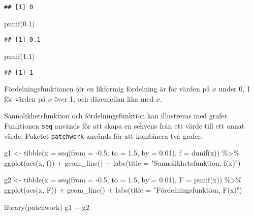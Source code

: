 \documentclass[
]{book}
\newenvironment{Shaded}{\begin{snugshade}}{\end{snugshade}}
\newcommand{\AttributeTok}[1]{\textcolor[rgb]{0.77,0.63,0.00}{#1}}
\newcommand{\FloatTok}[1]{\textcolor[rgb]{0.00,0.00,0.81}{#1}}
\newcommand{\FunctionTok}[1]{\textcolor[rgb]{0.00,0.00,0.00}{#1}}
\newcommand{\NormalTok}[1]{#1}
\newcommand{\OtherTok}[1]{\textcolor[rgb]{0.56,0.35,0.01}{#1}}
\newcommand{\SpecialCharTok}[1]{\textcolor[rgb]{0.00,0.00,0.00}{#1}}
\newcommand{\StringTok}[1]{\textcolor[rgb]{0.31,0.60,0.02}{#1}}
\theoremstyle{definition}
\theoremstyle{definition}
\theoremstyle{definition}
\theoremstyle{definition}
\theoremstyle{remark}
\begin{document}
\begin{verbatim}
## [1] 0
\end{verbatim}

\begin{Shaded}
\begin{Highlighting}[]
\FunctionTok{punif}\NormalTok{(}\FloatTok{0.1}\NormalTok{)}
\end{Highlighting}
\end{Shaded}

\begin{verbatim}
## [1] 0.1
\end{verbatim}

\begin{Shaded}
\begin{Highlighting}[]
\FunctionTok{punif}\NormalTok{(}\FloatTok{1.1}\NormalTok{)}
\end{Highlighting}
\end{Shaded}

\begin{verbatim}
## [1] 1
\end{verbatim}

Fördelningsfunktionen för en likformig fördelning är för värden på \(x\) under 0, 1 för värden på \(x\) över 1, och däremellan lika med \(x\).

Sannolikhetsfunktion och fördelningsfunktion kan illustreras med grafer. Funktionen \texttt{seq} används för att skapa en sekvens från ett värde till ett annat värde. Paketet \texttt{patchwork} används för att kombinera två grafer.

\begin{Shaded}
\begin{Highlighting}[]
\NormalTok{g1 }\OtherTok{\textless{}{-}} \FunctionTok{tibble}\NormalTok{(}\AttributeTok{x =} \FunctionTok{seq}\NormalTok{(}\AttributeTok{from =} \SpecialCharTok{{-}}\FloatTok{0.5}\NormalTok{, }\AttributeTok{to =} \FloatTok{1.5}\NormalTok{, }\AttributeTok{by =} \FloatTok{0.01}\NormalTok{),}
             \AttributeTok{f =} \FunctionTok{dunif}\NormalTok{(x)) }\SpecialCharTok{\%\textgreater{}\%} 
  \FunctionTok{ggplot}\NormalTok{(}\FunctionTok{aes}\NormalTok{(x, f)) }\SpecialCharTok{+} 
  \FunctionTok{geom\_line}\NormalTok{() }\SpecialCharTok{+}
  \FunctionTok{labs}\NormalTok{(}\AttributeTok{title =} \StringTok{"Sannolikhetsfunktion, f(x)"}\NormalTok{)}

\NormalTok{g2 }\OtherTok{\textless{}{-}} \FunctionTok{tibble}\NormalTok{(}\AttributeTok{x =} \FunctionTok{seq}\NormalTok{(}\AttributeTok{from =} \SpecialCharTok{{-}}\FloatTok{0.5}\NormalTok{, }\AttributeTok{to =} \FloatTok{1.5}\NormalTok{, }\AttributeTok{by =} \FloatTok{0.01}\NormalTok{),}
             \AttributeTok{F =} \FunctionTok{punif}\NormalTok{(x)) }\SpecialCharTok{\%\textgreater{}\%} 
  \FunctionTok{ggplot}\NormalTok{(}\FunctionTok{aes}\NormalTok{(x, F)) }\SpecialCharTok{+} 
  \FunctionTok{geom\_line}\NormalTok{() }\SpecialCharTok{+}
  \FunctionTok{labs}\NormalTok{(}\AttributeTok{title =} \StringTok{"Fördelningsfunktion, F(x)"}\NormalTok{)}

\FunctionTok{library}\NormalTok{(patchwork)}
\NormalTok{g1 }\SpecialCharTok{+}\NormalTok{ g2}
\end{Highlighting}
\end{Shaded}
\end{document}
